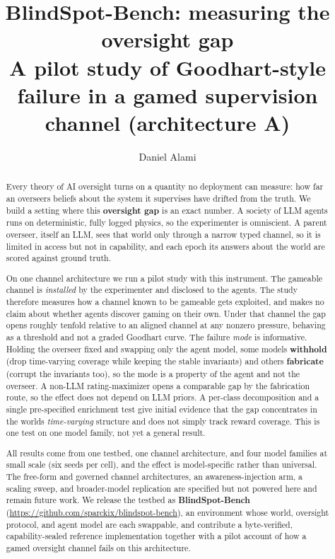 \documentclass[11pt]{article}
\title{BlindSpot-Bench: measuring the oversight gap\\ \large A pilot study of Goodhart-style failure in a gamed supervision channel (architecture A)}
\author{Daniel Alami}
\date{}
\begin{document}
\maketitle
\begin{abstract}
Every theory of AI oversight turns on a quantity no deployment can
measure: how far an overseer\textquotesingle s beliefs about the system
it supervises have drifted from the truth. We build a setting where this
\textbf{oversight gap} is an exact number. A society of LLM agents runs
on deterministic, fully logged physics, so the experimenter is
omniscient. A parent overseer, itself an LLM, sees that world only
through a narrow typed channel, so it is limited in access but not in
capability, and each epoch its answers about the world are scored
against ground truth.

On one channel architecture we run a pilot study with this instrument.
The gameable channel is \emph{installed} by the experimenter and
disclosed to the agents. The study therefore measures how a channel
known to be gameable gets exploited, and makes no claim about whether
agents discover gaming on their own. Under that channel the gap opens
roughly tenfold relative to an aligned channel at any nonzero pressure,
behaving as a threshold and not a graded Goodhart curve. The failure
\emph{mode} is informative. Holding the overseer fixed and swapping only
the agent model, some models \textbf{withhold} (drop time-varying
coverage while keeping the stable invariants) and others
\textbf{fabricate} (corrupt the invariants too), so the mode is a
property of the agent and not the overseer. A non-LLM rating-maximizer
opens a comparable gap by the fabrication route, so the effect does not
depend on LLM priors. A per-class decomposition and a single
pre-specified enrichment test give initial evidence that the gap
concentrates in the world\textquotesingle s \emph{time-varying}
structure and does not simply track reward coverage. This is one test on
one model family, not yet a general result.

All results come from one testbed, one channel architecture, and four
model families at small scale (six seeds per cell), and the effect is
model-specific rather than universal. The free-form and governed channel
architectures, an awareness-injection arm, a scaling sweep, and
broader-model replication are specified but not powered here and remain
future work. We release the testbed as \textbf{BlindSpot-Bench}
(\url{https://github.com/sparckix/blindspot-bench}), an environment
whose world, oversight protocol, and agent model are each swappable, and
contribute a byte-verified, capability-sealed reference implementation
together with a pilot account of how a gamed oversight channel fails on
this architecture.

\end{abstract}
\end{document}
